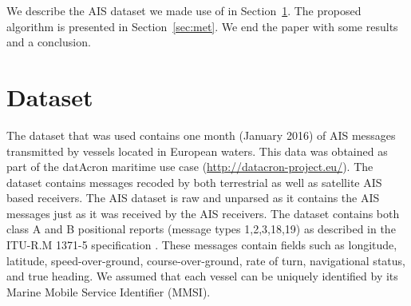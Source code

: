 \documentclass{article}
\begin{document}
 We describe the AIS dataset we made use of in Section~\ref{sec:data}. The proposed algorithm is presented in Section~\ref{sec:met}. We end the paper with some results and a conclusion.

% 
% 
% 
% 
 
\section{Dataset}
\label{sec:data}
The dataset that was used contains one month (January 2016) of AIS messages transmitted by vessels located in European waters. This data was
obtained as part of the datAcron maritime use case (\url{http://datacron-project.eu/}).  
The dataset contains messages recoded by both terrestrial as well as satellite AIS based receivers. The AIS dataset is raw and unparsed as it contains the AIS messages 
just as it was received by the AIS receivers. The dataset contains both class A and B positional reports (message types 1,2,3,18,19)
as described in the ITU-R.M 1371-5 specification \cite{itum}. These messages contain fields such as longitude, latitude,
speed-over-ground, course-over-ground, rate of turn, navigational status, and true heading. We assumed that each vessel
can be uniquely identified by its Marine Mobile Service Identifier (MMSI). 
\end{document}

